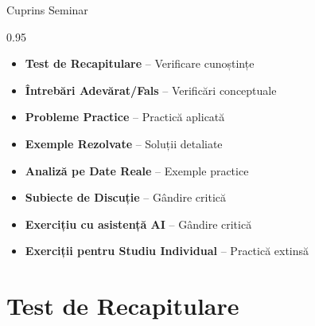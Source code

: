 \documentclass[9pt, aspectratio=169, t]{beamer}
\subtitle{Seminar 4: Modele SARIMA}
\begin{document}
{
\begin{frame}
    \titlepage
\end{frame}
}

\begin{frame}{Cuprins Seminar}
    \begin{cminipage}{0.95\textwidth}
    \begin{itemize}\setlength{\itemsep}{0pt}
        \item \textbf{Test de Recapitulare} -- Verificare cunoștințe
        \vspace{0.15cm}
        \item \textbf{Întrebări Adevărat/Fals} -- Verificări conceptuale
        \vspace{0.15cm}
        \item \textbf{Probleme Practice} -- Practică aplicată
        \vspace{0.15cm}
        \item \textbf{Exemple Rezolvate} -- Soluții detaliate
        \vspace{0.15cm}
        \item \textbf{Analiză pe Date Reale} -- Exemple practice
        \vspace{0.15cm}
        \item \textbf{Subiecte de Discuție} -- Gândire critică
        \vspace{0.15cm}
        \item \textbf{Exercițiu cu asistență AI} -- Gândire critică
        \vspace{0.15cm}
        \item \textbf{Exerciții pentru Studiu Individual} -- Practică extinsă
    \end{itemize}
    \end{cminipage}
\end{frame}


\section{Test de Recapitulare}
\end{document}
